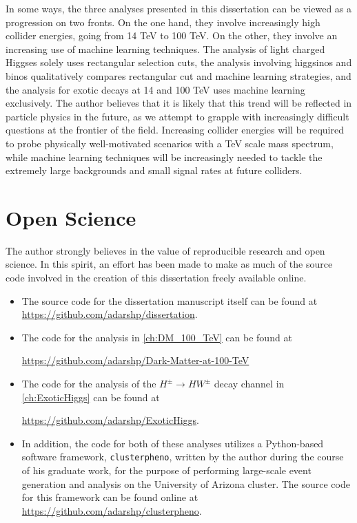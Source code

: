In some ways, the three analyses presented in this dissertation can be viewed as a progression on two fronts. On the one hand, they involve increasingly high collider energies, going from 14 TeV to 100 TeV. On the other, they involve an increasing use of machine learning techniques. The analysis of light charged Higgses solely uses rectangular selection cuts, the analysis involving higgsinos and binos qualitatively compares rectangular cut and machine learning strategies, and the analysis for exotic decays at 14 and 100 TeV  uses machine learning exclusively. The author believes that it is likely that this trend will be reflected in particle physics in the future, as we attempt to grapple with increasingly difficult questions at the frontier of the field. Increasing collider energies will be required to probe physically well-motivated scenarios with a TeV scale mass spectrum, while machine learning techniques will be increasingly needed to tackle the extremely large backgrounds and small signal rates at future colliders.

\section*{Open Science}

The author strongly believes in the value of reproducible research and open science. In this spirit, an effort has been made to make as much of the source code involved in the creation of this dissertation freely available online.

\begin{itemize}
\item The source code for the dissertation manuscript itself can be found at  \url{https://github.com/adarshp/dissertation}.

\item The code for the analysis in \autoref{ch:DM_100_TeV} can be found at

\url{https://github.com/adarshp/Dark-Matter-at-100-TeV}
\item The code for the analysis of the $H^\pm\rightarrow HW^\pm$ decay channel in \autoref{ch:ExoticHiggs} can be found at

\url{https://github.com/adarshp/ExoticHiggs}.
\item In addition, the code for both of these analyses utilizes a Python-based software framework, \texttt{clusterpheno}, written by the author during the course of his graduate work, for the purpose of performing large-scale event generation and analysis on the University of Arizona cluster. The source code for this framework can be found online at \url{https://github.com/adarshp/clusterpheno}.

\end{itemize}
